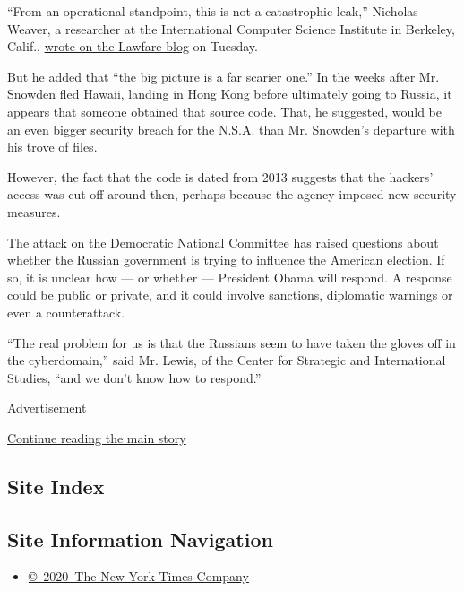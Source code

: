 ``From an operational standpoint, this is not a catastrophic leak,''
Nicholas Weaver, a researcher at the International Computer Science
Institute in Berkeley, Calif.,
\href{https://www.lawfareblog.com/very-bad-monday-nsa-0}{wrote on the
Lawfare blog} on Tuesday.

But he added that ``the big picture is a far scarier one.'' In the weeks
after Mr. Snowden fled Hawaii, landing in Hong Kong before ultimately
going to Russia, it appears that someone obtained that source code.
That, he suggested, would be an even bigger security breach for the
N.S.A. than Mr. Snowden's departure with his trove of files.

However, the fact that the code is dated from 2013 suggests that the
hackers' access was cut off around then, perhaps because the agency
imposed new security measures.

The attack on the Democratic National Committee has raised questions
about whether the Russian government is trying to influence the American
election. If so, it is unclear how --- or whether --- President Obama
will respond. A response could be public or private, and it could
involve sanctions, diplomatic warnings or even a counterattack.

``The real problem for us is that the Russians seem to have taken the
gloves off in the cyberdomain,'' said Mr. Lewis, of the Center for
Strategic and International Studies, ``and we don't know how to
respond.''

Advertisement

\protect\hyperlink{after-bottom}{Continue reading the main story}

\hypertarget{site-index}{%
\subsection{Site Index}\label{site-index}}

\hypertarget{site-information-navigation}{%
\subsection{Site Information
Navigation}\label{site-information-navigation}}

\begin{itemize}
\tightlist
\item
  \href{https://help.nytimes3xbfgragh.onion/hc/en-us/articles/115014792127-Copyright-notice}{©~2020~The
  New York Times Company}
\end{itemize}


